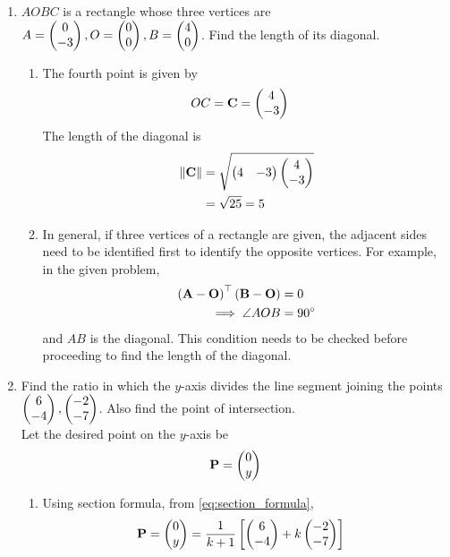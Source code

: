 \documentclass[journal,12pt,twocolumn]{IEEEtran}
\renewcommand\thesection{\arabic{section}}
\begin{document}
\begin{enumerate}[label=\thesection.\arabic*.,ref=\thesection.\theenumi]
  \item $AOBC$  is a rectangle whose three vertices are $A = \begin{pmatrix}0\\-3\end{pmatrix}, O = \begin{pmatrix}0\\0\end{pmatrix}, B = \begin{pmatrix}4\\0\end{pmatrix}$.  Find the length of its diagonal. 
	  \\
		\solution 
\begin{enumerate}
	\item The fourth point is given by 
  \begin{align}
	 OC =  \mathbf{C}&=\begin{pmatrix}4 \\ -3\end{pmatrix}
  \end{align}
  The length of the diagonal is 
		\begin{align}
			\left\lVert\mathbf{C}\right\rVert &= 
			 \sqrt{\begin{pmatrix}4 & -3\end{pmatrix}\begin{pmatrix}4 \\ -3\end{pmatrix}} 
\\
			&			=  \sqrt{25} = 5
		\end{align}
	\item  In general, if three vertices of a rectangle are given, the adjacent sides need to be identified first to identify the opposite vertices.  For example, in the given problem,  
  \begin{align}
	  \left(\mathbf{A}-\mathbf{O}\right)^{\top}\left(\mathbf{B}-\mathbf{O}\right) &= 0	 
	  \\
	  \implies \angle AOB &= 90\degree
  \end{align}
  and $AB$ is the diagonal.
This condition needs to be checked before proceeding to find the length of the diagonal.
\end{enumerate}
	\item  Find the ratio in which the $y$-axis divides the line segment joining the points $\begin{pmatrix}6 \\ -4\end{pmatrix}, \begin{pmatrix}-2 \\ -7\end{pmatrix} $.  Also find the point of intersection.
		\\
		\solution  Let the desired point on the $y$-axis be  
		\begin{align}
\mathbf{P} = \begin{pmatrix}0 \\ y\end{pmatrix}
		\end{align}
		\begin{enumerate}
		\item Using section formula, 
	  from \eqref{eq:section_formula},
		\begin{align}
			\vec{P} &= \myvec{0 \\ y}= \frac{1}{k+1}\sbrak{\myvec{6 \\ -4}+ k\myvec{-2 \\ -7} }

\end{align}
\end{enumerate}
\end{enumerate}
\end{document}
